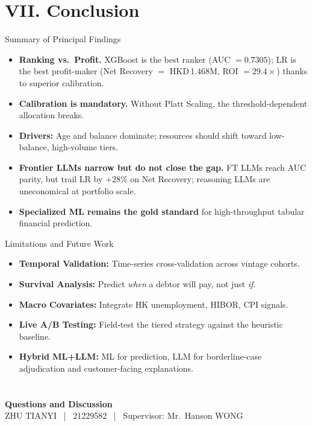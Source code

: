 \documentclass[10pt]{beamer}
\begin{document}
\section{VII. Conclusion}

\begin{frame}{\textrm{Summary of Principal Findings}}
    \begin{itemize}
        \item \textbf{Ranking vs.\ Profit.} XGBoost is the best ranker (AUC $=0.7305$); LR is the best profit-maker (Net Recovery $=$ HKD\,1.468M, ROI $=29.4\times$) thanks to superior calibration.
        \item \textbf{Calibration is mandatory.} Without Platt Scaling, the threshold-dependent allocation breaks.
        \item \textbf{Drivers:} Age and balance dominate; resources should shift toward low-balance, high-volume tiers.
        \item \textbf{Frontier LLMs narrow but do not close the gap.} FT LLMs reach AUC parity, but trail LR by $+28\%$ on Net Recovery; reasoning LLMs are uneconomical at portfolio scale.
        \item \textbf{Specialized ML remains the gold standard} for high-throughput tabular financial prediction.
    \end{itemize}
\end{frame}

\begin{frame}{\textrm{Limitations and Future Work}}
    \begin{itemize}
        \item \textbf{Temporal Validation:} Time-series cross-validation across vintage cohorts.
        \item \textbf{Survival Analysis:} Predict \emph{when} a debtor will pay, not just \emph{if}.
        \item \textbf{Macro Covariates:} Integrate HK unemployment, HIBOR, CPI signals.
        \item \textbf{Live A/B Testing:} Field-test the tiered strategy against the heuristic baseline.
        \item \textbf{Hybrid ML+LLM:} ML for prediction, LLM for borderline-case adjudication and customer-facing explanations.
    \end{itemize}
\end{frame}

\section*{}
\begin{frame}
\textcolor{hkustblue}{\Huge{}}
\vfill
\centering
\textbf{Questions and Discussion}
\vspace{0.6cm}\\
\small ZHU TIANYI ~|~ 21229582 ~|~ Supervisor: Mr.\ Hanson WONG
\end{frame}
\end{document}
